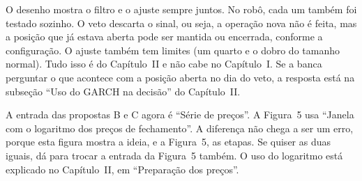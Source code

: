 \documentclass[11pt,a4paper]{article}
\begin{document}
\begin{cuidado}
O desenho mostra o filtro e o ajuste sempre juntos. No robô, cada um também foi
testado sozinho. O veto descarta o sinal, ou seja, a operação nova não é feita,
mas a posição que já estava aberta pode ser mantida ou encerrada, conforme a
configuração. O ajuste também tem limites (um quarto e o dobro do tamanho normal).
Tudo isso é do Capítulo~II e não cabe no Capítulo~I. Se a banca perguntar o que
acontece com a posição aberta no dia do veto, a resposta está na subseção ``Uso do
GARCH na decisão'' do Capítulo~II.
\end{cuidado}

\begin{cuidado}[A entrada]
A entrada das propostas B e C agora é ``Série de preços''. A Figura~5 usa ``Janela
com o logaritmo dos preços de fechamento''. A diferença não chega a ser um erro,
porque esta figura mostra a ideia, e a Figura~5, as etapas. Se quiser as duas
iguais, dá para trocar a entrada da Figura~5 também. O uso do logaritmo está
explicado no Capítulo~II, em ``Preparação dos preços''.
\end{cuidado}
\end{document}
